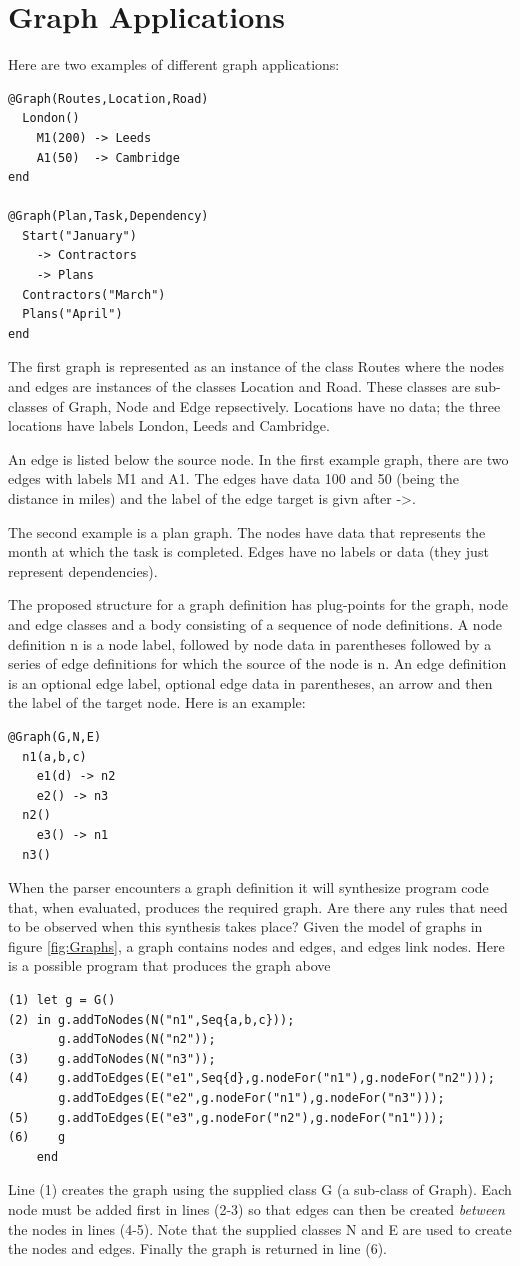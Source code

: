 \section{Graph Applications}

Here are two examples of different graph applications:

\begin{lstlisting}
@Graph(Routes,Location,Road)
  London()
    M1(200) -> Leeds
    A1(50)  -> Cambridge
end

@Graph(Plan,Task,Dependency)
  Start("January")
    -> Contractors
    -> Plans
  Contractors("March")
  Plans("April")
end
\end{lstlisting}The first graph is represented as an instance of the class Routes
where the nodes and edges are instances of the classes Location and
Road. These classes are sub-classes of Graph, Node and Edge repsectively.
Locations have no data; the three locations have labels London, Leeds
and Cambridge. 

An edge is listed below the source node. In the first example graph,
there are two edges with labels M1 and A1. The edges have data 100
and 50 (being the distance in miles) and the label of the edge target
is givn after ->.

The second example is a plan graph. The nodes have data that represents
the month at which the task is completed. Edges have no labels or
data (they just represent dependencies).

The proposed structure for a graph definition has plug-points for
the graph, node and edge classes and a body consisting of a sequence
of node definitions. A node definition n is a node label, followed
by node data in parentheses followed by a series of edge definitions
for which the source of the node is n. An edge definition is an optional
edge label, optional edge data in parentheses, an arrow and then the
label of the target node. Here is an example:

\begin{lstlisting}
@Graph(G,N,E)
  n1(a,b,c)
    e1(d) -> n2
    e2() -> n3
  n2()
    e3() -> n1
  n3()
\end{lstlisting}When the parser encounters a graph definition it will synthesize program
code that, when evaluated, produces the required graph. Are there
any rules that need to be observed when this synthesis takes place?
Given the model of graphs in figure \ref{fig:Graphs}, a graph contains
nodes and edges, and edges link nodes. Here is a possible program
that produces the graph above\begin{lstlisting}
(1) let g = G()
(2) in g.addToNodes(N("n1",Seq{a,b,c}));
       g.addToNodes(N("n2"));
(3)    g.addToNodes(N("n3"));
(4)    g.addToEdges(E("e1",Seq{d},g.nodeFor("n1"),g.nodeFor("n2")));
       g.addToEdges(E("e2",g.nodeFor("n1"),g.nodeFor("n3")));
(5)    g.addToEdges(E("e3",g.nodeFor("n2"),g.nodeFor("n1")));
(6)    g
    end
\end{lstlisting}Line (1) creates the graph using the supplied class G (a sub-class
of Graph). Each node must be added first in lines (2-3) so that edges
can then be created \textit{between} the nodes in lines (4-5). Note
that the supplied classes N and E are used to create the nodes and
edges. Finally the graph is returned in line (6).

